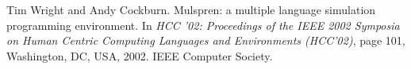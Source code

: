 \documentclass[openbib]{book}
\begin{document}
\begin{thebibliography}{1}
Tim Wright and Andy Cockburn.
\newblock Mulspren: a multiple language simulation programming environment.
\newblock In {\em HCC '02: Proceedings of the IEEE 2002 Symposia
  on Human Centric Computing Languages and Environments (HCC'02)},
  page 101, Washington, DC, USA, 2002. IEEE Computer Society.
\end{thebibliography}
\end{document}
